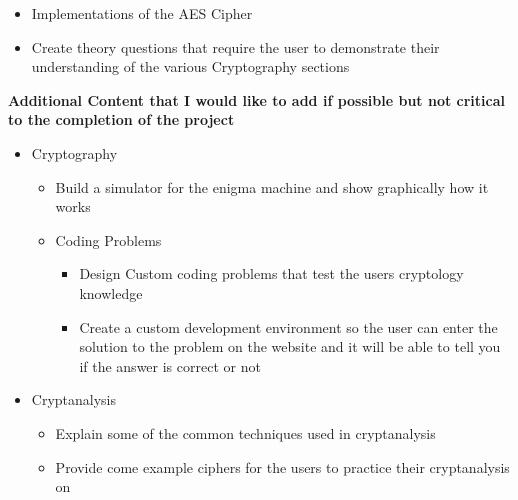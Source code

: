 \begin{itemize}
{\begin{itemize}
{\begin{itemize}
{\begin{itemize}
\item{Electronic Codebook Mode (ECB)}
\item{Cipher Block Chaining (CBC)}
\item{Output Feedback Mode (OFB)}
\item{Cipher Feedback Mode (CFB)}
\item{Counter Mode (CTR)}
\item{Galois Counter Mode (GCM)}
\end{itemize}}
\item{Stream Ciphers
\begin{itemize}
\item{Stream ciphers based off Linear Feedback Shift Register (LFSR)}
\end{itemize}}
\item{Hashing Functions
\begin{itemize}
\item{MD5}
\item{SHA-1}
\item{SHA-2}
\item{SHA-3}
\end{itemize}}
\end{itemize}}
\item{Implementations of the AES Cipher}
\item{Create theory questions that require the user to demonstrate their understanding of the various Cryptography sections}
\end{itemize}}
\end{itemize}
{\noindent
\textbf{Additional Content that I would like to add if possible but not critical to the completion of the project}}

\begin{itemize} %
\item{Cryptography
\begin{itemize}
\item{Build a simulator for the enigma machine and show graphically how it works}
\item{Coding Problems
\begin{itemize}
\item{Design Custom coding problems that test the users cryptology knowledge}
\item{Create a custom development environment so the user can enter the solution to the problem on the website and it will be able to tell you if the answer is correct or not}
\end{itemize}}
\end{itemize}}
\item{Cryptanalysis
\begin{itemize}
\item{Explain some of the common techniques used in cryptanalysis}
\item{Provide come example ciphers for the users to practice their cryptanalysis on}
\end{itemize}}
\end{itemize}


